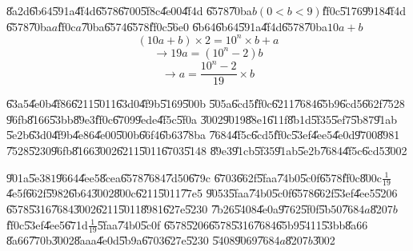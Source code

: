 \documentclass{article}
\begin{document}
\bigskip

\bigskip

\U{8a2d}\U{6b64}\U{591a}\U{4f4d}\U{6578}\U{6700}\U{5f8c}\U{4e00}\U{4f4d}%
\U{6578}\U{70ba}$b\left( 0<b<9\right) $\U{ff0c}\U{5176}\U{9918}\U{4f4d}%
\U{6578}\U{70ba}$a$\U{ff0c}$a$\U{70ba}\U{6574}\U{6578}\U{ff0c}\U{56e0}%
\U{6b64}\U{6b64}\U{591a}\U{4f4d}\U{6578}\U{70ba}$10a+b$%
\[
\left( 10a+b\right) \times 2=10^{n}\times b+a 
\]%
\[
\rightarrow 19a=\left( 10^{n}-2\right) b 
\]%
\[
\rightarrow a=\frac{10^{n}-2}{19}\times b 
\]

\U{63a5}\U{4e0b}\U{4f86}\U{6211}\U{5011}\U{63d0}\U{4f9b}\U{5169}\U{500b}%
\U{505a}\U{6cd5}\U{ff0c}\U{6211}\U{7684}\U{65b9}\U{6cd5}\U{662f}\U{7528}%
\U{96fb}\U{8166}\U{53bb}\U{89e3}\U{ff0c}\U{6709}\U{9ede}\U{4f5c}\U{5f0a}%
\U{3002}\U{9019}\U{88e1}\U{611f}\U{8b1d}\U{5f35}\U{5ef7}\U{5b87}\U{91ab}%
\U{5e2b}\U{63d0}\U{4f9b}\U{4e86}\U{4e00}\U{500b}\U{66f4}\U{6b63}\U{78ba}%
\U{7684}\U{4f5c}\U{6cd5}\U{ff0c}\U{53ef}\U{4ee5}\U{4e0d}\U{9700}\U{8981}%
\U{7528}\U{5230}\U{96fb}\U{8166}\U{3002}\U{6211}\U{5011}\U{6703}\U{5148}%
\U{89e3}\U{91cb}\U{5f35}\U{91ab}\U{5e2b}\U{7684}\U{4f5c}\U{6cd5}\U{3002}

\bigskip

\U{901a}\U{5e38}$1$\U{9664}\U{4ee5}\U{8cea}\U{6578}\U{7684}\U{7d50}\U{679c}%
\U{6703}\U{662f}\U{5faa}\U{74b0}\U{5c0f}\U{6578}\U{ff0c}\U{800c}$\frac{1}{19}
$\U{4e5f}\U{662f}\U{5982}\U{6b64}\U{3002}\U{800c}\U{6211}\U{5011}\U{77e5}%
\U{9053}\U{5faa}\U{74b0}\U{5c0f}\U{6578}\U{662f}\U{53ef}\U{4ee5}\U{5206}%
\U{6578}\U{5316}\U{7684}\U{3002}\U{6211}\U{5011}\U{8981}\U{627e}\U{5230}%
\U{7b26}\U{5408}\U{4e0a}\U{9762}\U{5f0f}\U{5b50}\U{7684}$a$\U{8207}$b$%
\U{ff0c}\U{53ef}\U{4ee5}\U{671d}$\frac{1}{19}$\U{5faa}\U{74b0}\U{5c0f}%
\U{6578}\U{5206}\U{6578}\U{5316}\U{7684}\U{65b9}\U{5411}\U{53bb}\U{8a66}%
\U{8a66}\U{770b}\U{3002}\U{8aaa}\U{4e0d}\U{5b9a}\U{6703}\U{627e}\U{5230}%
\U{5408}\U{9069}\U{7684}$a$\U{8207}$b$\U{3002}

\bigskip
\end{document}
